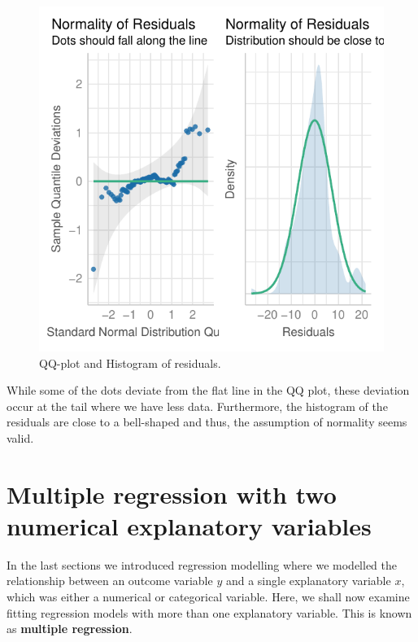 \documentclass[
  letterpaper,
  DIV=11,
  numbers=noendperiod]{scrartcl}
\begin{document}
\begin{figure}[H]

{\centering \includegraphics{index_files/figure-pdf/unnamed-chunk-22-1.pdf}

}

\caption{QQ-plot and Histogram of residuals.}

\end{figure}%

While some of the dots deviate from the flat line in the QQ plot, these
deviation occur at the tail where we have less data. Furthermore, the
histogram of the residuals are close to a bell-shaped and thus, the
assumption of normality seems valid.

\section{Multiple regression with two numerical explanatory
variables}\label{multiple-regression-with-two-numerical-explanatory-variables}

In the last sections we introduced regression modelling where we
modelled the relationship between an outcome variable \(y\) and a single
explanatory variable \(x\), which was either a numerical or categorical
variable. Here, we shall now examine fitting regression models with more
than one explanatory variable. This is known as \textbf{multiple
regression}.
\end{document}
